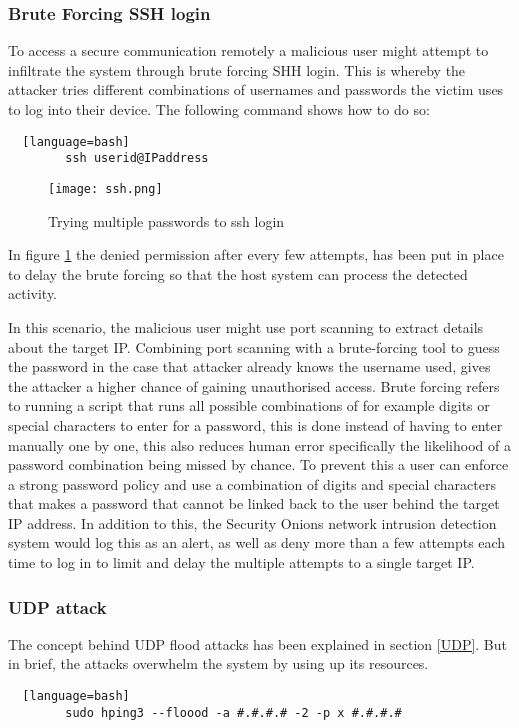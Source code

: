 \documentclass[12pt]{article}
\begin{document}
		\subsubsection{Brute Forcing SSH login}
		To access a secure communication remotely a malicious user might attempt to infiltrate the system through brute forcing SHH login. This is whereby the attacker tries different combinations of usernames and passwords the victim uses to log into their device. The following command shows how to do so:
		\begin{lstlisting}  [language=bash]
		ssh userid@IPaddress
		\end{lstlisting}
		
		
		\begin{center}
		\begin{figure}[H]
			\centering
			\texttt{[image: ssh.png]}
			\caption{Trying multiple passwords to ssh login } 
			\label{fig:34}
		\end{figure}
		\end{center}
		
		In figure \ref{fig:34} the denied permission after every few attempts, has been put in place to delay the brute forcing so that the host system can process the detected activity.
		
		
		In this scenario, the malicious user might use port scanning to extract details about the target IP. Combining port scanning with a brute-forcing tool to guess the password in the case that attacker already knows the username used, gives the attacker a higher chance of gaining unauthorised access. Brute forcing refers to running a script that runs all possible combinations of for example digits or special characters to enter for a password, this is done instead of having to enter manually one by one, this also reduces human error specifically the likelihood of a password combination being missed by chance. 
		To prevent this a user can enforce a strong password policy and use a combination of digits and special characters that makes a password that cannot be linked back to the user behind the target IP address. In addition to this, the Security Onions network intrusion detection system would log this as an alert, as well as deny more than a few attempts each time to log in to limit and delay the multiple attempts to a single target IP.
		
		\subsubsection{UDP attack}
		The concept behind UDP flood attacks has been explained in section \ref{UDP}. But in brief, the attacks overwhelm the system by using up its resources.
		\begin{lstlisting}  [language=bash]
		sudo hping3 --floood -a #.#.#.# -2 -p x #.#.#.#
		\end{lstlisting}
		
\end{document}
